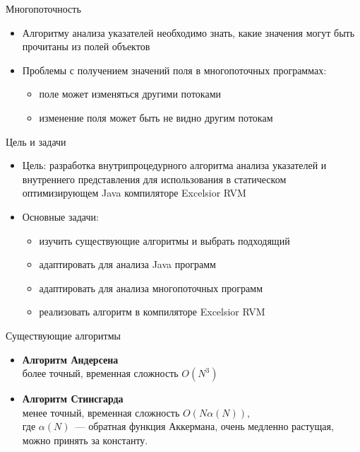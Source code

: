 \documentclass[usenames,dvipsnames,pdftex,unicode]{beamer}
\begin{document}
\begin{frame}{Многопоточность}

  \begin{itemize}
    \item<1-> Алгоритму анализа указателей необходимо знать, какие значения
          могут быть прочитаны из полей объектов
    \item<1-> Проблемы с получением значений поля в многопоточных программах:
          \begin{itemize}
            \item<2-> поле может изменяться другими потоками
            \item<3-> изменение поля может быть не видно другим потокам
          \end{itemize}
  \end{itemize}

\end{frame}

\begin{frame}{Цель и задачи}

  \begin{itemize}
    \item Цель: разработка внутрипроцедурного алгоритма анализа указателей и
          внутреннего представления для использования в статическом
          оптимизирующем Java компиляторе Excelsior RVM
    \item Основные задачи:
      \begin{itemize}
        \item изучить существующие алгоритмы и выбрать подходящий
        \item адаптировать для анализа Java программ
        \item адаптировать для анализа многопоточных программ
        \item реализовать алгоритм в компиляторе Excelsior RVM
      \end{itemize}
  \end{itemize}

\end{frame}

\begin{frame}{Существующие алгоритмы}

  \begin{itemize}
    \item \textbf{Алгоритм Андерсена}\\более точный, временная сложность $O(N^3)$
    \item \textbf{Алгоритм Стинсгарда}\\менее точный, временная сложность $O(N
          \alpha(N))$,\\где $\alpha(N)$~--- обратная функция Аккермана, очень
          медленно растущая, можно принять за константу.
  \end{itemize}

\end{frame}
\end{document}
